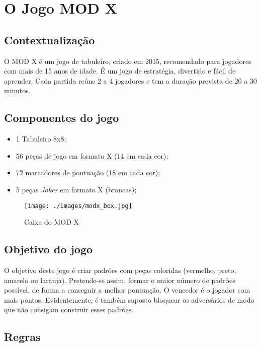 \documentclass[a4paper]{article}
\begin{document}
\newpage

\section{O Jogo MOD X\newline}

\subsection{Contextualização}
O MOD X é um jogo de tabuleiro, criado em 2015, recomendado para jogadores com mais de 15 anos de idade.
É um jogo de estratégia, divertido e fácil de aprender.
Cada partida reúne 2 a 4 jogadores e tem a duração prevista de 20 a 30 minutos. 

\subsection{Componentes do jogo}
\begin{itemize}
	\item 1 Tabuleiro 8x8;
	\item 56 peças de jogo em formato X (14 em cada cor);
	\item 72 marcadores de pontuação (18 em cada cor);
	\item 5 peças \textit{Joker} em formato X (brancas);
\end{itemize}

\begin{figure}[h!]
	\begin{center}
		\texttt{[image: ./images/modx\_box.jpg]}
		\caption{Caixa do MOD X}
		\label{fig:1}
	\end{center}
\end{figure}

\subsection{Objetivo do jogo}

O objetivo deste jogo é criar padrões com peças coloridas (vermelho, preto, amarelo ou laranja).
Pretende-se assim, formar o maior número de padrões possível, de forma a conseguir a melhor pontuação.
O vencedor é o jogador com mais pontos.
Evidentemente, é também suposto bloquear os adversários de modo que não consigam construir esses padrões.  

\subsection{Regras}
\end{document}
